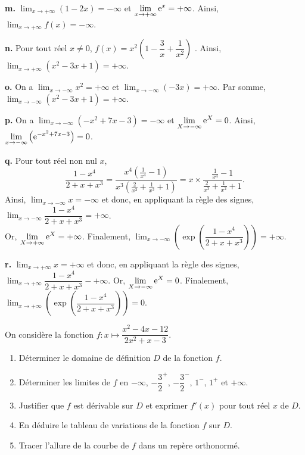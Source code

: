 \documentclass[11pt,fleqn, openany]{book} %
\begin{document}
\begin{solution}
\textbf{m.} $\displaystyle \lim_{x \to +\infty}(1-2x)=-\infty$ et $\displaystyle \lim_{x \to +\infty} \mathrm{e}^x =+\infty$. Ainsi, $\displaystyle \lim_{x \to +\infty} f(x)=-\infty$.

\textbf{n.} Pour tout réel $x\neq 0$, $f(x)=x^2\left(1-\dfrac{3}{x}+\dfrac{1}{x^2}\right)$ . Ainsi, $\displaystyle \lim_{x \to +\infty} \left( x^2-3x+1\right)=+\infty$.

\textbf{o.} On a $\displaystyle\lim_{x \to -\infty}x^2=+\infty$ et $\displaystyle\lim_{x \to -\infty}(-3x)=+\infty$. Par somme, $\displaystyle \lim_{x \to -\infty} \left( x^2-3x+1\right)=+\infty$.

\textbf{p.} On a $\displaystyle \lim_{x \to -\infty} (-x^2+7x-3)=-\infty$ et $\displaystyle \lim_{X \to -\infty} \mathrm{e}^X=0$. Ainsi, $\displaystyle \lim_{x \to -\infty}\left( \mathrm{e}^{-x^2+7x-3}\right)=0$.

\textbf{q.} Pour tout réel non nul $x$, 
\[\dfrac{1-x^4}{2+x+x^3}=\dfrac{x^4\left(\frac{1}{x^4}-1\right)}{x^3\left(\frac{2}{x^3}+\frac{1}{x^2}+1\right)}=x \times \dfrac{\frac{1}{x^4}-1}{\frac{2}{x^3}+\frac{1}{x^2}+1}.\]
Ainsi,  $\displaystyle \lim_{x \to -\infty} x=-\infty$ et donc, en appliquant la règle des signes, $\displaystyle \lim_{x \to -\infty}\dfrac{1-x^4}{2+x+x^3}=+\infty$. \\ Or, $\displaystyle \lim_{X \to +\infty} \mathrm{e}^X=+\infty$. Finalement, $\displaystyle \lim_{x \to -\infty}\left( \exp\left( \dfrac{1-x^4}{2+x+x^3}\right)\right)=+\infty$.

\textbf{r.} $\displaystyle \lim_{x \to +\infty} x=+\infty$ et donc, en appliquant la règle des signes, $\displaystyle \lim_{x \to +\infty}\dfrac{1-x^4}{2+x+x^3}-+\infty$. Or, $\displaystyle \lim_{X \to -\infty} \mathrm{e}^X=0$. Finalement, $\displaystyle \lim_{x \to +\infty}\left( \exp\left( \dfrac{1-x^4}{2+x+x^3}\right)\right)=0$.
\end{solution}





\begin{exercise}On considère la fonction $f:x\mapsto \dfrac{x^2-4x-12}{2x^2+x-3}$.
\begin{enumerate}
\item Déterminer le domaine de définition $D$ de la fonction $f$.
\item Déterminer les limites de $f$ en $-\infty$, $-\dfrac{3}{2}^+$, $-\dfrac{3}{2}^-$, $1^-$, $1^+$ et $+\infty$.
\item Justifier que $f$ est dérivable sur $D$ et exprimer $f'(x)$ pour tout réel $x$ de $D$.
\item En déduire le tableau de variations de la fonction $f$ sur $D$.
\item Tracer l'allure de la courbe de $f$ dans un repère orthonormé.
\end{enumerate}\end{exercise}
\end{document}

